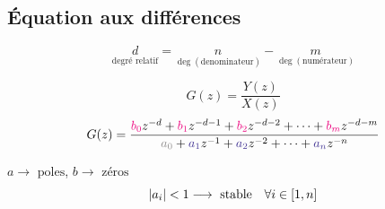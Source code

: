 \documentclass[resume]{subfiles}
\def\bcolor{\textcolor{RubineRed}}
\def\acolor{\textcolor{BlueViolet}}
\begin{document}
\subsection{Équation aux différences}
$$\underset{\text{degré relatif}}{d}=\underset{\deg(\text{denominateur})}{n}-\underset{\deg(\text{numérateur})}{m}$$
\begin{small}
$$G(z)=\frac{Y(z)}{X(z)}$$
$$G(z)=\frac{\bcolor{b_0}z^{-d}+\bcolor{b_1}z^{-d-1}+\bcolor{b_2}z^{-d-2}+\cdots+\bcolor{b_m}z^{-d-m}}{\textcolor{Gray}{a_0}+\acolor{a_1}z^{-1}+\acolor{a_2}z^{-2}+\cdots+\acolor{a_n}z^{-n}}$$
\end{small}
$a\longrightarrow \text{ poles}$, $b\longrightarrow\text{ zéros}$
$$\abs{a_i}<1\longrightarrow\text{ stable}\quad \forall i\in [1,n]$$
\end{document}
